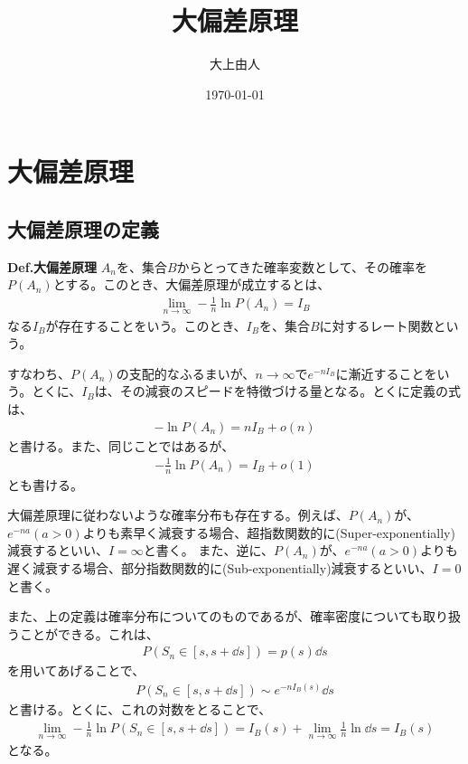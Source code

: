 \documentclass[a4paper,11pt]{jsarticle}
\numberwithin{equation}{section}
\begin{document}
\title{大偏差原理}
\author{大上由人}
\date{\today}
\maketitle

\section{大偏差原理}
\subsection{大偏差原理の定義}
\begin{itembox}[l]{\textbf{Def.大偏差原理} }
    $A_n$を、集合$B$からとってきた確率変数として、その確率を$P(A_n)$とする。このとき、大偏差原理が成立するとは、
    \begin{align}
        \lim_{n \to \infty} -\frac{1}{n} \ln P(A_n) =I_B
    \end{align}
    なる$I_B$が存在することをいう。このとき、$I_B$を、集合$B$に対するレート関数という。
\end{itembox}
すなわち、$P(A_n)$の支配的なふるまいが、$n \to \infty$で$e^{-nI_B}$に漸近することをいう。とくに、$I_B$は、その減衰のスピードを特徴づける量となる。とくに定義の式は、
\begin{align}
    -\ln P(A_n) = nI_B + o(n)
\end{align}
と書ける。また、同じことではあるが、
\begin{align}
    -\frac{1}{n} \ln P(A_n) = I_B + o(1)
\end{align}
とも書ける。

大偏差原理に従わないような確率分布も存在する。例えば、$P(A_n) $が、$e^{-na} (a>0)$よりも素早く減衰する場合、超指数関数的に(Super-exponentially)減衰するといい、$ I = \infty$と書く。
また、逆に、$P(A_n) $が、$e^{-na} (a>0)$よりも遅く減衰する場合、部分指数関数的に(Sub-exponentially)減衰するといい、$ I = 0$と書く。

また、上の定義は確率分布についてのものであるが、確率密度についても取り扱うことができる。これは、
\begin{align}
    P(S_n \in [s, s+\dd{s}]) = p(s) \dd{s}
\end{align}
を用いてあげることで、
\begin{align}
    P(S_n \in [s, s+\dd{s}]) \sim e^{-nI_B(s)} \dd{s}
\end{align}
と書ける。とくに、これの対数をとることで、
\begin{align}
    \lim_{n \to \infty} -\frac{1}{n} \ln P(S_n \in [s, s+\dd{s}]) = I_B(s) + \lim_{n \to \infty} \frac{1}{n} \ln \dd{s} = I_B(s)
\end{align}
となる。
\end{document}
